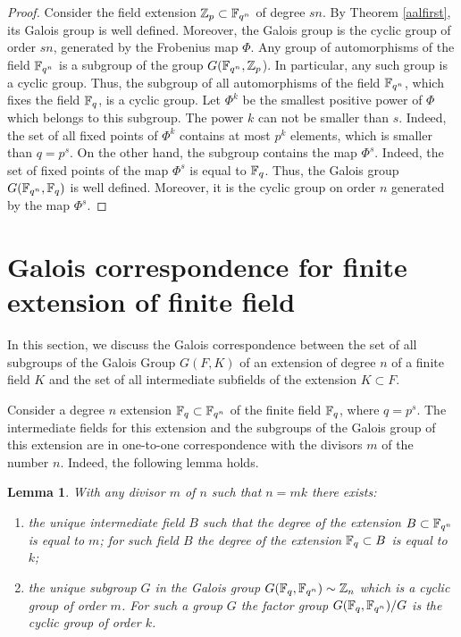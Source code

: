 \documentclass[11pt]{article}
\theoremstyle{plain}
\newtheorem{lemma}[theorem]{Lemma}
\theoremstyle{definition}
\begin{document}
 \begin{proof} Consider the field extension $\Bbb Z_p\subset \Bbb F_{q^n}$ of degree $sn$.  By Theorem \ref{aalfirst}, its Galois   group  is well defined. Moreover, the Galois group  is the cyclic group of order $sn$, generated by the Frobenius  map $\Phi $. Any group of automorphisms of the field $\Bbb F_{q^n}$ is a subgroup of the group $G(\Bbb F_{q^n},\Bbb Z_p$). In particular, any such group  is a cyclic group. Thus, the
 subgroup of all automorphisms of the field $\Bbb F_{q^n}$, which fixes the field $\Bbb F_q$, is a cyclic group. Let $\Phi^k$ be the smallest positive power of $\Phi$ which belongs to this subgroup. The power $k$ can not be smaller than $s$. Indeed,  the set of all fixed points of $\Phi^k$  contains  at most  $p^k$ elements, which is smaller than $q=p^s$. On the other hand, the subgroup  contains the map $\Phi^s$. Indeed, the set of fixed points of the map $\Phi^s$ is equal to $\Bbb F_{q}$. Thus, the Galois group $G(\Bbb F_{q^n},\Bbb F_q)$ is well defined. Moreover, it is the cyclic group on order $n$ generated by the map $\Phi^s$.
\end{proof}

\section{Galois correspondence for finite extension of finite field}\label{seven}
In this section, we discuss the Galois correspondence between the set of all subgroups  of the Galois Group $G(F,K)$ of an extension of degree $n$ of a finite field $K$ and  the set of all intermediate subfields  of the extension $K\subset F$.

Consider a degree $n$ extension $\Bbb F_q\subset \Bbb F_{q^n}$ of the finite field $\Bbb F_q$, where $q=p^s$. The intermediate fields for this extension and the subgroups of the  Galois  group of this extension are in one-to-one correspondence with the divisors $m$ of the number $n$.  Indeed, the following lemma holds.

\begin{lemma}  With any divisor $m$ of $n$ such that $n=mk$ there exists:
\begin{enumerate}                                              \item the unique intermediate  field $B$ such that the degree
  of the extension $B\subset \Bbb F_{q^n}$ is equal to
  $m$; for such field $B$ the degree of the extension $\Bbb F_q\subset B$ is equal to $k$;

\item the unique subgroup $G$ in the
Galois  group   $G(\Bbb F_q,\Bbb F_{q^n})\sim \Bbb Z_n$
which is a cyclic group of order $m$.  For such a group $G$
the factor group  $G(\Bbb F_q,\Bbb F_{q^n})/G$  is
the  cyclic group of order $k$.
\end{enumerate}
\end{lemma}
\end{document}
